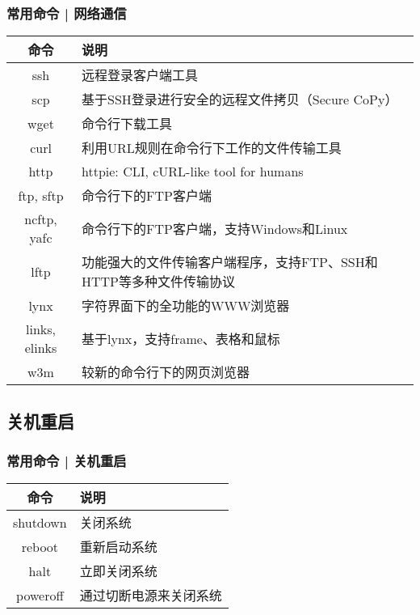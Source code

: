 \begin{frame}[fragile]
  \frametitle{常用命令 | 网络通信}
  \begin{table}
    \centering
    \begin{tabularx}{0.9\textwidth}{cX}
      \hline
      \rowcolor{blue!50}命令 & 说明\\
      \hline
      ssh & 远程登录客户端工具\\
      scp & \footnotesize{基于SSH登录进行安全的远程文件拷贝（Secure CoPy）}\\
      wget & 命令行下载工具\\
      curl & 利用URL规则在命令行下工作的文件传输工具\\
      http & httpie: CLI, cURL-like tool for humans\\
      \hline
      ftp, sftp & 命令行下的FTP客户端\\
      ncftp, yafc & 命令行下的FTP客户端，支持Windows和Linux\\
      lftp & 功能强大的文件传输客户端程序，支持FTP、SSH和HTTP等多种文件传输协议\\
      \hline
      lynx & 字符界面下的全功能的WWW浏览器\\
      links, elinks & 基于lynx，支持frame、表格和鼠标\\
      w3m & 较新的命令行下的网页浏览器\\
      \hline
    \end{tabularx}
  \end{table}
\end{frame}

\subsection{关机重启}
\begin{frame}
  \frametitle{常用命令 | \alert{关机重启}}
  \begin{table}
    \centering
    \begin{tabularx}{0.9\textwidth}{cX}
      \hline
      \rowcolor{blue!50}命令 & 说明\\
      \hline
      shutdown & 关闭系统\\
      reboot & 重新启动系统\\
      halt & 立即关闭系统\\
      poweroff & 通过切断电源来关闭系统\\
      \hline
    \end{tabularx}
  \end{table}
\end{frame}

